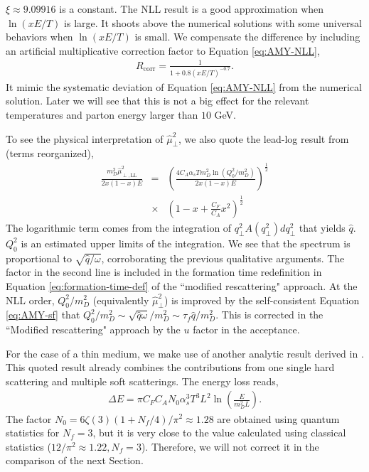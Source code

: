 \documentclass[aps, prc, reprint, amsmath, groupedaddress, nofootinbib]{revtex4-1}
\begin{document}
$\xi\approx9.09916$ is a constant. 
The NLL result is a good approximation when $\ln(xE/T)$ is large. 
It shoots above the numerical solutions with some universal behaviors when $\ln(xE/T)$ is small.
We compensate the difference by including an artificial multiplicative correction factor to Equation \ref{eq:AMY-NLL}, 
\begin{eqnarray}\label{eq:correction}
R_{\textrm{corr}} = \frac{1}{1+0.8\left(xE/T\right)^{-0.7}}.
\end{eqnarray}
It mimic the systematic deviation of Equation \ref{eq:AMY-NLL} from the numerical solution. 
Later we will see that this is not a big effect for the relevant temperatures and parton energy larger than $10$ GeV.

To see the physical interpretation of $\hat{\mu}_\perp^2$, we also quote the lead-log result from \cite{Arnold:2008zu} (terms reorganized),
\begin{eqnarray}\label{eq:AMY-LL}
\nonumber
\frac{m_D^2\hat{\mu}_{\perp, \textrm{LL}}^2}{2x(1-x)E} &=& 
\left(\frac{4C_A\alpha_s T m_D^2 \ln\left(Q_0^2/m_D^2\right)}{2x(1-x)E}\right)^{\frac{1}{2}}\\
&\times& \left(1-x+\frac{C_F}{C_A}x^2\right)^{\frac{1}{2}}
\end{eqnarray}
The logarithmic term comes from the integration of $q_\perp^2 A(q_\perp^2)dq_\perp^2$ that yields $\hat{q}$.
$Q_0^2$ is an estimated upper limits of the integration.
We see that the spectrum is proportional to $\sqrt{\hat{q}/\omega}$, corroborating the previous qualitative arguments.
The factor in the second line is included in the formation time redefinition in Equation \ref{eq:formation-time-def} of the ``modified rescattering" approach.
At the NLL order, $Q_0^2/m_D^2$ (equivalently $\hat{\mu}_\perp^2$) is improved by the self-consistent Equation \ref{eq:AMY-sf} that $Q_0^2/m_D^2 \sim \sqrt{\hat{q}\omega}/m_D^2\sim \tau_f\hat{q}/m_D^2$. 
This is corrected in the ``Modified rescattering" approach by the $u$ factor in the acceptance.

For the case of a thin medium, we make use of another analytic result derived in \cite{Arnold:2009mr}. 
This quoted result already combines the contributions from one single hard scattering and multiple soft scatterings.
The energy loss reads,
\begin{eqnarray}\label{eq:dE-thin}
\Delta E = \pi C_F C_A N_0 \alpha_s^3 T^3 L^2 \ln\left(\frac{E}{m_D^2 L}\right).
\end{eqnarray}
The factor $N_0 = 6\zeta(3)(1+N_f/4)/\pi^2 \approx 1.28$ 
are obtained using quantum statistics for $N_f=3$, but it is very close to the value calculated using classical statistics ($12/\pi^2 \approx 1.22, N_f=3$).
Therefore, we will not correct it in the comparison of the next Section.
\end{document}
